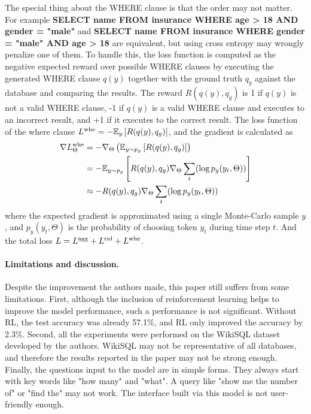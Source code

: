 The special thing about the WHERE clause is that the order may not matter. For
example \textbf{SELECT name FROM insurance WHERE age > 18 AND gender = "male"}
and \textbf{SELECT name FROM insurance WHERE gender = "male" AND age > 18} are
equivalent, but using cross entropy may wrongly penalize one of them. To handle
this, the loss function is computed as the negative expected reward over
possible WHERE clauses by executing the generated WHERE clause $q(y)$ together
with the ground truth $q_g$ against the database and comparing the results. The
reward $R(q(y), q_g)$ is 1 if $q(y)$ is not a valid WHERE clause, -1 if $q(y)$
is a valid WHERE clause and executes to an incorrect result, and +1 if it
executes to the correct result. The loss function of the where clause $L^{\rm
			whe} = - \mathbb{E}_y\left[ R(q(y), q_g) \right]$, and the gradient is
calculated as
\begin{align*}
	\nabla L^{\rm whe}_{\Theta} & = -\nabla_{\Theta} \left(\mathbb{E}_{y \sim p_y}\left[ R(q(y), q_g) \right]   \right)                 \\
	                            & = - \mathbb{E}_{y \sim p_y}\left[ R(q(y), q_g)  \nabla_{\Theta} \sum_t(\log p_y(y_t, \Theta)) \right] \\
	                            & \approx -R(q(y), q_g) \nabla_{\Theta} \sum_t(\log p_y(y_t, \Theta))
\end{align*}
where the expected gradient is approximated using a single Monte-Carlo sample
$y$, and $p_y(y_t, \Theta)$ is the probability of choosing token $y_t$ during
time step $t$. And the total loss $L = L^{\rm agg} + L^{\rm col} + L^{\rm
			whe}$.

\paragraph{Limitations and discussion.}
Despite the improvement the authors made, this paper still suffers from some
limitations. First, although the inclusion of reinforcement learning helps to
improve the model performance, such a performance is not significant. Without
RL, the test accuracy was already 57.1\%, and RL only improved the accuracy by
2.3\%. Second, all the experiments were performed on the WikiSQL dataset
developed by the authors. WikiSQL may not be representative of all databases,
and therefore the results reported in the paper may not be strong enough.
Finally, the questions input to the model are in simple forms. They always
start with key words like "how many" and "what". A query like "show me the
number of" or "find the" may not work. The interface built via this model is
not user-friendly enough.

